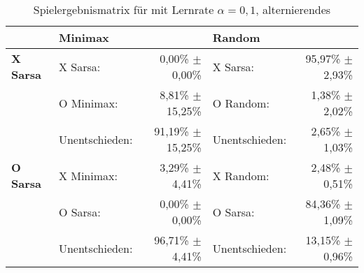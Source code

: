 \begin{table}[!h]
\centering
\caption[Spielergebnismatrix \sarsa: $\alpha=0,1$, alternierendes \splay]{Spielergebnismatrix für \sarsa mit Lernrate $\alpha=0,1$, alternierendes \splay}

\begin{tabular}{llrlr}
\toprule
 & \multicolumn{2}{l}{\textbf{Minimax}} & \multicolumn{2}{l}{\textbf{Random}} \\ \midrule
\textbf{X Sarsa}        & X Sarsa:          & 0,00\% $\pm$    0,00\%            & X Sarsa:              & 95,97\% $\pm$ 2,93\%  \\
                        & O Minimax:        & 8,81\% $\pm$    15,25\%           & O Random:             & 1,38\% $\pm$  2,02\%  \\
                        & Unentschieden:    & 91,19\% $\pm$   15,25\%           & Unentschieden:        & 2,65\% $\pm$  1,03\%  \\ \cmidrule{2-5}
\textbf{O Sarsa}        & X Minimax:        & 3,29\% $\pm$    4,41\%            & X Random:             & 2,48\% $\pm$  0,51\%  \\
                        & O Sarsa:          & 0,00\% $\pm$    0,00\%            & O Sarsa:              & 84,36\% $\pm$ 1,09\%  \\
                        & Unentschieden:    & 96,71\% $\pm$   4,41\%            & Unentschieden:        & 13,15\% $\pm$ 0,96\%  \\ \bottomrule
\end{tabular}
\end{table}